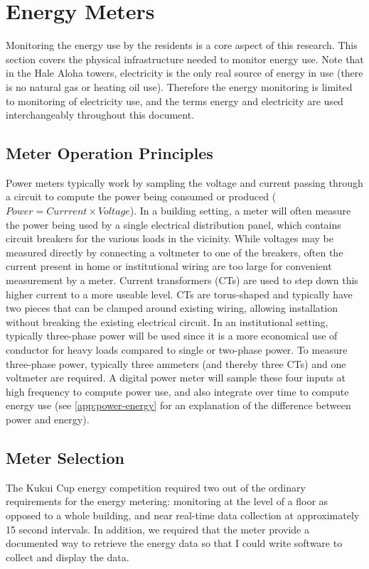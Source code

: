 \section{Energy Meters}

Monitoring the energy use by the residents is a core aspect of this research. This section covers the physical infrastructure needed to monitor energy use. Note that in the Hale Aloha towers, electricity is the only real source of energy in use (there is no natural gas or heating oil use). Therefore the energy monitoring is limited to monitoring of electricity use, and the terms energy and electricity are used interchangeably throughout this document.


\subsection{Meter Operation Principles}

Power meters typically work by sampling the voltage and current passing through a circuit to compute the power being consumed or produced ($Power = Currrent \times Voltage$). In a building setting, a meter will often measure the power being used by a single electrical distribution panel, which contains circuit breakers for the various loads in the vicinity. While voltages may be measured directly by connecting a voltmeter to one of the breakers, often the current present in home or institutional wiring are too large for convenient measurement by a meter. Current transformers (CTs) are used to step down this higher current to a more useable level. CTs are torus-shaped and typically have two pieces that can be clamped around existing wiring, allowing installation without breaking the existing electrical circuit. In an institutional setting, typically three-phase power will be used since it is a more economical use of conductor for heavy loads compared to single or two-phase power. To measure three-phase power, typically three ammeters (and thereby three CTs) and one voltmeter are required. A digital power meter will sample these four inputs at high frequency to compute power use, and also integrate over time to compute energy use (see \autoref{app:power-energy} for an explanation of the difference between power and energy).


\subsection{Meter Selection}

The Kukui Cup energy competition required two out of the ordinary requirements for the energy metering: monitoring at the level of a floor as opposed to a whole building, and near real-time data collection at approximately 15 second intervals. In addition, we required that the meter provide a documented way to retrieve the energy data so that I could write software to collect and display the data.

